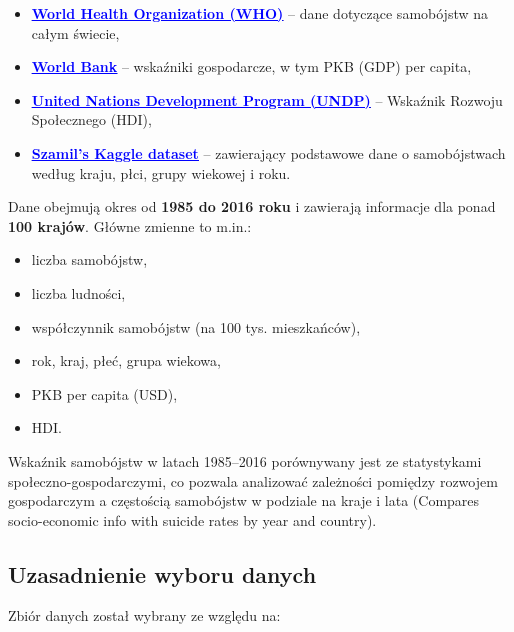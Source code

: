 \documentclass[polish]{article}
\begin{document}
    \begin{itemize}
        \item \textbf{{\href{http://www.who.int/mental_health/suicide-prevention/en/}{\textcolor{blue}{\uline{World Health Organization (WHO)}}}}} – dane dotyczące samobójstw na całym świecie,
        \item \textbf{{\href{http://databank.worldbank.org/data/source/world-development-indicators#}{\textcolor{blue}{\uline{World Bank}}}}} – wskaźniki gospodarcze, w tym PKB (GDP) per capita,
        \item \textbf{{\href{http://hdr.undp.org/en/indicators/137506}{\textcolor{blue}{\uline{United Nations Development Program (UNDP)}}}}} – Wskaźnik Rozwoju Społecznego (HDI),
        \item \textbf{\href{https://www.kaggle.com/szamil/suicide-in-the-twenty-first-century/notebook}{\textcolor{blue}{\uline{Szamil’s Kaggle dataset}}}} – zawierający podstawowe dane o samobójstwach według kraju, płci, grupy wiekowej i roku.
    \end{itemize}

    Dane obejmują okres od \textbf{1985 do 2016 roku} i zawierają informacje dla ponad \textbf{100 krajów}. Główne zmienne to m.in.:

    \begin{itemize}
        \item liczba samobójstw,
        \item liczba ludności,
        \item współczynnik samobójstw (na 100 tys. mieszkańców),
        \item rok, kraj, płeć, grupa wiekowa,
        \item PKB per capita (USD),
        \item HDI.
    \end{itemize}

    Wskaźnik samobójstw w latach 1985–2016 porównywany jest ze statystykami społeczno-gospodarczymi, co pozwala analizować zależności pomiędzy rozwojem gospodarczym a częstością samobójstw w podziale na kraje i lata (Compares socio-economic info with suicide rates by year and country).

    \subsection*{Uzasadnienie wyboru danych}

    Zbiór danych został wybrany ze względu na:
\end{document}
